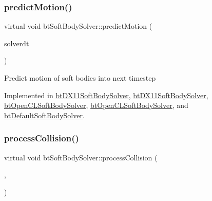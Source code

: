\mbox{\label{classbtSoftBodySolver_a72f0c095ae30002a6f98fc194a63e1ba}} 
\subsubsection{\texorpdfstring{predict\+Motion()}{predictMotion()}}
{\footnotesize\ttfamily virtual void bt\+Soft\+Body\+Solver\+::predict\+Motion (\begin{DoxyParamCaption}\item[{float}]{solverdt }\end{DoxyParamCaption})\hspace{0.3cm}{\ttfamily [pure virtual]}}

Predict motion of soft bodies into next timestep 

Implemented in \hyperlink{classbtDX11SoftBodySolver_a2565453dfc806f819746d7bc04a57a96}{bt\+D\+X11\+Soft\+Body\+Solver}, \hyperlink{classbtDX11SoftBodySolver_a408e312da4af3721c9f3e0a5e2c2473d}{bt\+D\+X11\+Soft\+Body\+Solver}, \hyperlink{classbtOpenCLSoftBodySolver_ab48872d1de7b5b960d462c71d36ee92d}{bt\+Open\+C\+L\+Soft\+Body\+Solver}, \hyperlink{classbtOpenCLSoftBodySolver_a489602e08b20f977be04543e616abf46}{bt\+Open\+C\+L\+Soft\+Body\+Solver}, and \hyperlink{classbtDefaultSoftBodySolver_a4fc93a921db26b802b6f9fa05d9a7d6b}{bt\+Default\+Soft\+Body\+Solver}.

\mbox{\label{classbtSoftBodySolver_a7dea7c2ce8ad4e8cae29219ffeebe18d}} 
\subsubsection{\texorpdfstring{process\+Collision()}{processCollision()}\hspace{0.1cm}{\footnotesize\ttfamily [1/2]}}
{\footnotesize\ttfamily virtual void bt\+Soft\+Body\+Solver\+::process\+Collision (\begin{DoxyParamCaption}\item[{\hyperlink{classbtSoftBody}{bt\+Soft\+Body} $\ast$}]{,  }\item[{const struct \hyperlink{structbtCollisionObjectWrapper}{bt\+Collision\+Object\+Wrapper} $\ast$}]{ }\end{DoxyParamCaption})\hspace{0.3cm}{\ttfamily [pure virtual]}}

